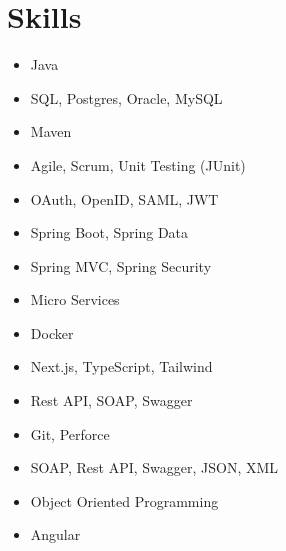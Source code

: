 \documentclass[a4paper, 10pt]{article}
\newcommand{\resumeItemNoSub}[1]{\item\small{{#1}}}
\newcommand{\resumeSubHeadingListStart}{\begin{itemize}[leftmargin=*]}
\newcommand{\resumeSubHeadingListEnd}{\end{itemize}}
\begin{document}


\section{Skills}
\vspace{-10pt}
\begin{multicols}{3}
  \resumeSubHeadingListStart
  
  \item{Java}
  \item{SQL, Postgres, Oracle, MySQL}
  \item{Maven}
  \item{Agile, Scrum, Unit Testing (JUnit)}
  \item{OAuth, OpenID, SAML, JWT}

  \item{Spring Boot, Spring Data}
  \item{Spring MVC, Spring Security}
  \item{Micro Services}
  \item{Docker}
  \item{Next.js, TypeScript, Tailwind}

  \item{Rest API, SOAP, Swagger}
  \item{Git, Perforce}
  \item{SOAP, Rest API, Swagger, JSON, XML}
  \item{Object Oriented Programming}
  \item{Angular}
  
  \resumeSubHeadingListEnd
\end{multicols}

\end{document}

